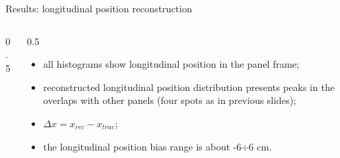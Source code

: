 \documentclass{beamer}[10pt]
\begin{document}
\begin{frame}{Results: longitudinal position reconstruction}
\begin{columns}
\begin{column}{0.5\framewidth}
    \end{column}
    \begin{column}{0.5\framewidth}
      \begin{itemize}
        \item all histograms show longitudinal position in the panel frame;
        \vspace{3mm}
      \item reconstructed longitudinal position distribution presents peaks in the overlaps with other panels (four spots as in previous slides);
        \vspace{3mm}
      \item $\Delta x = x_{rec}-x_{true}$;
      \vspace{3mm}
        \item the longitudinal position bias range is about -6$\div$6 cm.
      \end{itemize}
    \end{column}
  \end{columns}
\end{frame}
\end{document}
